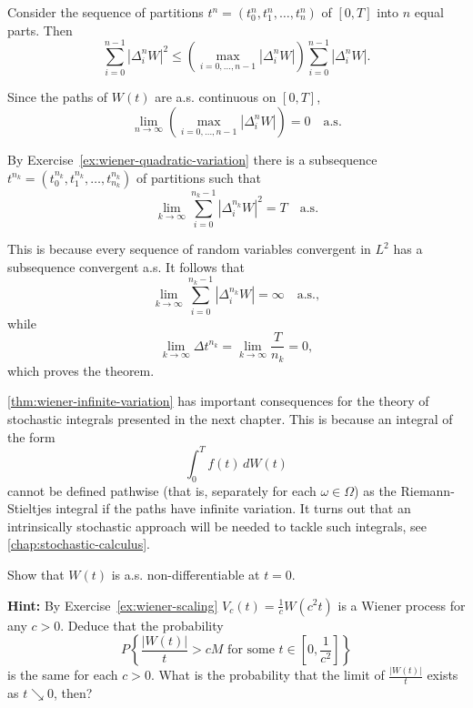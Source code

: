 \begin{Proof}
Consider the sequence of partitions $t^n = (t_0^n, t_1^n, \ldots, t_n^n)$ of $[0, T]$ into $n$ equal parts. Then
\[
\sum_{i=0}^{n-1} |\Delta_i^n W|^2 \leq \left(\max_{i=0, \ldots, n-1} |\Delta_i^n W|\right) \sum_{i=0}^{n-1} |\Delta_i^n W|.
\]

Since the paths of $W(t)$ are a.s. continuous on $[0, T]$,
\[
\lim_{n \to \infty} \left(\max_{i=0, \ldots, n-1} |\Delta_i^n W|\right) = 0 \quad \text{a.s.}
\]

By Exercise~\ref{ex:wiener-quadratic-variation} there is a subsequence $t^{n_k} = (t_0^{n_k}, t_1^{n_k}, \ldots, t_{n_k}^{n_k})$ of partitions such that
\[
\lim_{k \to \infty} \sum_{i=0}^{n_k-1} |\Delta_i^{n_k} W|^2 = T \quad \text{a.s.}
\]

This is because every sequence of random variables convergent in $L^2$ has a subsequence convergent a.s. It follows that
\[
\lim_{k \to \infty} \sum_{i=0}^{n_k-1} |\Delta_i^{n_k} W| = \infty \quad \text{a.s.},
\]
while
\[
\lim_{k \to \infty} \Delta t^{n_k} = \lim_{k \to \infty} \frac{T}{n_k} = 0,
\]
which proves the theorem.
\end{Proof}

\cref{thm:wiener-infinite-variation} has important consequences for the theory of stochastic integrals presented in the next chapter. This is because an integral of the form
\[
\int_0^T f(t) \, dW(t)
\]
cannot be defined pathwise (that is, separately for each $\omega \in \Omega$) as the Riemann-Stieltjes integral if the paths have infinite variation. It turns out that an intrinsically stochastic approach will be needed to tackle such integrals, see \cref{chap:stochastic-calculus}.

\begin{Exercise}
\label{ex:wiener-nondifferentiable-zero}
Show that $W(t)$ is a.s. non-differentiable at $t = 0$.

\noindent\textbf{Hint:} By Exercise~\ref{ex:wiener-scaling} $V_c(t) = \frac{1}{c} W(c^2 t)$ is a Wiener process for any $c > 0$. Deduce that the probability
\[
P\left\{\frac{|W(t)|}{t} > cM \text{ for some } t \in [0, \frac{1}{c^2}]\right\}
\]
is the same for each $c > 0$. What is the probability that the limit of $\frac{|W(t)|}{t}$ exists as $t \searrow 0$, then?
\end{Exercise}

